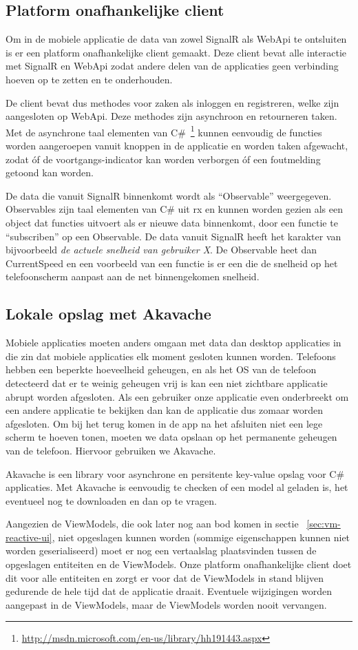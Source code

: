 \subsection{Platform onafhankelijke client}
Om in de mobiele applicatie de data van zowel SignalR als WebApi te ontsluiten is er een platform onafhankelijke client gemaakt. Deze client bevat alle interactie met SignalR en WebApi zodat andere delen van de applicaties geen verbinding hoeven op te zetten en te onderhouden.

De client bevat dus methodes voor zaken als inloggen en registreren, welke zijn aangesloten op WebApi. Deze methodes zijn asynchroon en retourneren taken. Met de asynchrone taal elementen van C\#~\footnote{\url{http://msdn.microsoft.com/en-us/library/hh191443.aspx}} kunnen eenvoudig de functies worden aangeroepen vanuit knoppen in de applicatie en worden taken afgewacht, zodat óf de voortgangs-indicator kan worden verborgen óf een foutmelding getoond kan worden.

De data die vanuit SignalR binnenkomt wordt als ``Observable'' weergegeven. Observables zijn taal elementen van C\# uit \ac{rx} en kunnen worden gezien als een object dat functies uitvoert als er nieuwe data binnenkomt, door een functie te ``subscriben'' op een Observable. De data vanuit SignalR heeft het karakter van bijvoorbeeld \textit{de actuele snelheid van gebruiker X}. De Observable heet dan CurrentSpeed en een voorbeeld van een functie is er een die de snelheid op het telefoonscherm aanpast aan de net binnengekomen snelheid.

\subsection{Lokale opslag met Akavache}
Mobiele applicaties moeten anders omgaan met data dan desktop applicaties in die zin dat mobiele applicaties elk moment gesloten kunnen worden. Telefoons hebben een beperkte hoeveelheid geheugen, en als het OS van de telefoon detecteerd dat er te weinig geheugen vrij is kan een niet zichtbare applicatie abrupt worden afgesloten. Als een gebruiker onze applicatie even onderbreekt om een andere applicatie te bekijken dan kan de applicatie dus zomaar worden afgesloten. Om bij het terug komen in de app na het afsluiten niet een lege scherm te hoeven tonen, moeten we data opslaan op het permanente geheugen van de telefoon. Hiervoor gebruiken we Akavache.

Akavache is een library voor asynchrone en persitente key-value opslag voor C\# applicaties. Met Akavache is eenvoudig te checken of een model al geladen is, het eventueel nog te downloaden en dan op te vragen. 

Aangezien de ViewModels, die ook later nog aan bod komen in sectie ~\ref{sec:vm-reactive-ui}, niet opgeslagen kunnen worden (sommige eigenschappen kunnen niet worden geserialiseerd) moet er nog een vertaalslag plaatsvinden tussen de opgeslagen entiteiten en de ViewModels. Onze platform onafhankelijke client doet dit voor alle entiteiten en zorgt er voor dat  de ViewModels in stand blijven gedurende de hele tijd dat de applicatie draait. Eventuele wijzigingen worden aangepast in de ViewModels, maar de ViewModels worden nooit vervangen.
